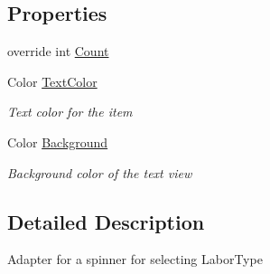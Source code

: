 \subsection*{Properties}
\begin{DoxyCompactItemize}
\item 
override int \hyperlink{class_field_service_1_1_android_1_1_labor_type_spinner_adapter_a9fedc13e8194e04934df26de54bb6621}{Count}
\item 
Color \hyperlink{class_field_service_1_1_android_1_1_labor_type_spinner_adapter_a4dcd5fd34ea5f510f67b2f87cb3b5b29}{Text\+Color}
\begin{DoxyCompactList}\small\item\em Text color for the item \end{DoxyCompactList}\item 
Color \hyperlink{class_field_service_1_1_android_1_1_labor_type_spinner_adapter_a64b78267d3126e4cbdf0b1a50ec6d1d4}{Background}
\begin{DoxyCompactList}\small\item\em Background color of the text view \end{DoxyCompactList}\end{DoxyCompactItemize}


\subsection{Detailed Description}
Adapter for a spinner for selecting Labor\+Type 



